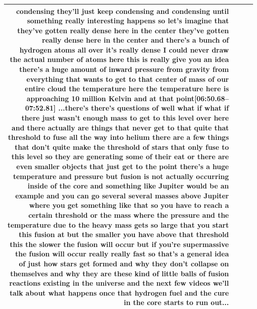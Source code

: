\documentclass[10pt]{article}
\begin{document}
\begin{tiny}
\begin{longtable}{|r|p{0.375in}|p{1.275in}|p{3.5in}|}
condensing they'll just keep condensing and condensing until something really interesting happens so let's imagine that they've gotten really dense here in the center they've gotten really dense here in the center and there's a bunch of hydrogen atoms all over it's really dense I could never draw the actual number of atoms here this is really give you an idea there's a huge amount of inward pressure from gravity from everything that wants to get to that center of mass of our entire cloud the temperature here the temperature here is approaching 10 million Kelvin and at that point\newline\textbf{[06:50.68--07:52.81]} ...there's there's questions of well what if what if there just wasn't enough mass to get to this level over here and there actually are things that never get to that quite that threshold to fuse all the way into helium there are a few things that don't quite make the threshold of stars that only fuse to this level so they are generating some of their eat or there are even smaller objects that just get to the point there's a huge temperature and pressure but fusion is not actually occurring inside of the core and something like Jupiter would be an example and you can go several several masses above Jupiter where you get something like that so you have to reach a certain threshold or the mass where the pressure and the temperature due to the heavy mass gets so large that you start this fusion at but the smaller you have above that threshold this the slower the fusion will occur but if you're supermassive the fusion will occur really really fast so that's a general idea of just how stars get formed and why they don't collapse on themselves and why they are these kind of little balls of fusion reactions existing in the universe and the next few videos we'll talk about what happens once that hydrogen fuel and the cure in the core starts to run out... \\\hline

\end{longtable}
\end{tiny}
\end{document}

